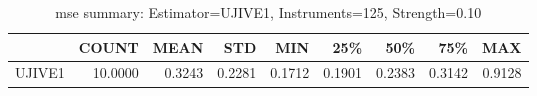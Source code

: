 \begin{table}[ht]
\centering
\caption{mse summary: Estimator=UJIVE1, Instruments=125, Strength=0.10}
\begin{tabular}{lrrrrrrrr}
\toprule
 & COUNT & MEAN & STD & MIN & 25\% & 50\% & 75\% & MAX \\
\midrule
UJIVE1 & 10.0000 & 0.3243 & 0.2281 & 0.1712 & 0.1901 & 0.2383 & 0.3142 & 0.9128 \\
\bottomrule
\end{tabular}
\end{table}
